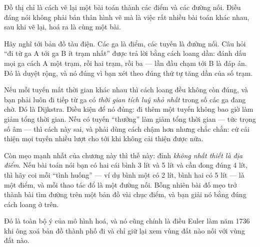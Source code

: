 \documentclass[../../algorithm.tex]{subfiles}
\begin{document}
\begin{dongian}
Đồ thị chỉ là cách vẽ lại một bài toán thành các điểm và các đường nối. Điều đáng nói không phải bản thân hình vẽ mà là việc rất nhiều bài toán khác nhau, sau khi vẽ lại, hoá ra là cùng một bài.

Hãy nghĩ tới bản đồ tàu điện. Các ga là điểm, các tuyến là đường nối. Câu hỏi ``đi từ ga A tới ga B ít trạm nhất'' được trả lời bằng cách loang dần: đánh dấu mọi ga cách A một trạm, rồi hai trạm, rồi ba --- lần đầu chạm tới B là đáp án. Đó là duyệt rộng, và nó đúng vì bạn xét theo đúng thứ tự tăng dần của số trạm.

Nếu mỗi tuyến mất thời gian khác nhau thì cách loang đều không còn đúng, và bạn phải luôn đi tiếp từ ga có \emph{thời gian tích luỹ nhỏ nhất} trong số các ga đang chờ. Đó là Dijkstra. Điều kiện để nó đúng: đi thêm một tuyến không bao giờ làm giảm tổng thời gian. Nếu có tuyến ``thưởng'' làm giảm tổng thời gian --- tức trọng số âm --- thì cách này sai, và phải dùng cách chậm hơn nhưng chắc chắn: cứ cải thiện mọi tuyến nhiều lượt cho tới khi không cải thiện được nữa.

Còn mẹo mạnh nhất của chương này thì thế này: đỉnh \emph{không nhất thiết là địa điểm}. Nếu bài toán nói bạn có hai cái bình 3 lít và 5 lít và cần đong đúng 4 lít, thì hãy coi mỗi ``tình huống'' --- ví dụ bình một có 2 lít, bình hai có 5 lít --- là một điểm, và mỗi thao tác đổ là một đường nối. Bỗng nhiên bài đố mẹo trở thành bài tìm đường trên một bản đồ vài chục điểm, và bạn giải nó bằng đúng cách loang ở trên.

Đó là toàn bộ ý của mô hình hoá, và nó cũng chính là điều Euler làm năm 1736 khi ông xoá bản đồ thành phố đi và chỉ giữ lại xem vùng đất nào nối với vùng đất nào.
\end{dongian}
\end{document}
